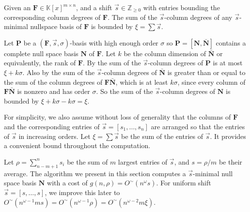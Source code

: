 \begin{lem}
\label{lem:boundOfSumOfShiftedDegreesOfNullspaceBasis}Given an $\mathbf{F}\in\mathbb{K}\left[x\right]^{m\times n}$,
and a shift $\vec{s}\in\mathbb{Z}_{\ge0}$ with entries bounding the
corresponding column degrees of $\mathbf{F}$. The sum of the $\vec{s}$-column
degrees of any $\vec{s}$-minimal nullspace basis of $\mathbf{F}$
is bounded by $\xi=\sum\vec{s}$.\end{lem}
\begin{pf}
Let $\mathbf{P}$ be a $(\mathbf{F},\vec{s},\sigma)$-basis with high
enough order $\sigma$ so $\mathbf{P}=\left[\mathbf{N},\bar{\mathbf{N}}\right]$
contains a complete null space basis $\mathbf{N}$ of $\mathbf{F}$.
Let $k$ be the column dimension of $\bar{\mathbf{N}}$ or equivalently,
the rank of $\mathbf{F}$. By 
the sum of the $\vec{s}$-column degrees of $\mathbf{P}$ is at most
$\xi+k\sigma$. Also by  the sum
of the $\vec{s}$-column degrees of $\bar{\mathbf{N}}$ is greater
than or equal to the sum of the column degrees of $\mathbf{F}\bar{\mathbf{N}}$,
which is at least $k\sigma$, since every column of $\mathbf{F}\bar{\mathbf{N}}$
is nonzero and has order $\sigma$. So the sum of the $\vec{s}$-column
degrees of $\mathbf{N}$ is bounded by $\xi+k\sigma-k\sigma=\xi$.
\end{pf}
\begin{comment}
This allows the initial bound on the shift to propagate on both the
intermediate results $\mathbf{A}$ and the residual $\mathbf{FA}$
to propagate throughout the computation, hence the complexity 
\end{comment}


For simplicity, we also assume without loss of generality that the
columns of $\mathbf{F}$ and the corresponding entries of $\vec{s}=\left[s_{1},\dots,s_{n}\right]$
are arranged so that the entries of $\vec{s}$ in increasing orders.
Let $\xi=\sum\vec{s}$ be the sum of the entries of $\vec{s}$. It
provides a convenient bound throughout the computation.%
\begin{comment}
 The algorithm we present in this section computes a $\vec{s}$-minimal
null space basis $\mathbf{N}$ with a cost of $h(n,\xi)=O^{\sim}(n^{\omega-1}\xi)$.
\end{comment}
{} Let $\rho=\sum_{n-m+1}^{n}s_{i}$ be the sum of $m$ largest entries
of $\vec{s}$, and $s=\rho/m$ be their average. The algorithm we
present in this section computes a $\vec{s}$-minimal null space basis
$\mathbf{N}$ with a cost of $g(n,\rho)=O^{\sim}(n^{\omega}s)$. For
uniform shift $\vec{s}=\left[s,\dots,s\right]$, we improve this later
to $O^{\sim}\left(n^{\omega-1}ms\right)=O^{\sim}\left(n^{\omega-1}\rho\right)=O^{\sim}\left(n^{\omega-2}m\xi\right)$.
\begin{comment}
For general unbalanced shifts, the cost improvement requires the ability
to efficiently compute order basis with general shifts.
\end{comment}


